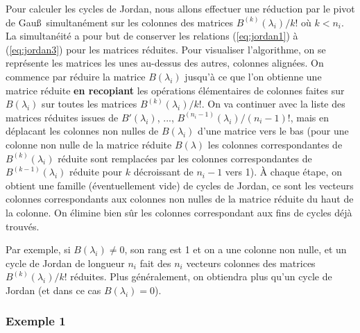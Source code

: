 \documentclass[a4paper,11pt]{article}
\begin{document}
\begin{giacjshere}
Pour calculer les cycles de Jordan, nous allons effectuer une
r\'eduction par le pivot de Gau\ss\ simultan\'ement sur les colonnes
des matrices $B^{(k)}(\lambda _i)/k!$ o\`u $k<n_i$. 
La simultan\'eit\'e a pour but de conserver les
relations (\ref{eq:jordan1}) \`a (\ref{eq:jordan3}) pour les matrices
r\'eduites. Pour visualiser l'algorithme, on se repr\'esente les
matrices les unes au-dessus des autres, colonnes align\'ees.
On commence par r\'eduire la matrice $B(\lambda _i)$ jusqu'\`a ce
que l'on obtienne une matrice r\'eduite {\bf en recopiant} les op\'erations
\'el\'ementaires de colonnes faites sur $B(\lambda _i)$ sur toutes les matrices
$B^{(k)}(\lambda _i)/k!$. On va continuer avec la liste des matrices
r\'eduites issues de $B'(\lambda _i)$, ..., 
$B^{(n_i-1)}(\lambda _i)/(n_i-1)!$, 
mais en d\'eplacant les colonnes non nulles de $B(\lambda _i)$ 
d'une matrice vers le bas
(pour une colonne non nulle de la matrice r\'eduite $B(\lambda )$
les colonnes correspondantes de $B^{(k)}(\lambda _i)$ r\'eduite 
sont remplac\'ees par les colonnes correspondantes de $B^{(k-1)}(\lambda _i)$
r\'eduite pour $k$ d\'ecroissant de $n_i-1$ vers 1).
\`A chaque \'etape, on obtient une famille (\'eventuellement vide)
de cycles de Jordan, ce sont les vecteurs colonnes correspondants 
aux colonnes non nulles de la matrice r\'eduite du haut de la colonne.
On \'elimine bien s\^ur les colonnes correspondant aux fins de cycles
d\'ej\`a trouv\'es.

Par exemple, si $B(\lambda _i)\neq 0$, son rang est 1 et on a
une colonne non nulle, et un cycle de Jordan de longueur
$n_i$ fait des $n_i$ vecteurs colonnes des matrices
$B^{(k)}(\lambda _i)/k!$ r\'eduites. 
Plus g\'en\'eralement, on obtiendra plus qu'un cycle de Jordan
(et dans ce cas $B(\lambda _i)= 0$).


\subsubsection{Exemple 1} \label{sec:ex1}


\end{giacjshere}
\end{document}
